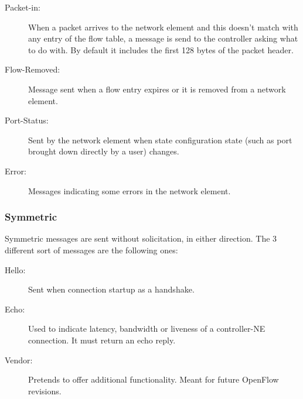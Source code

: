  \begin{description}
\item[ Packet-in:] When a packet arrives to the network element and this doesn't match with any entry of the flow table, a message is send to the controller asking what to do with. By default it includes the first 128 bytes of the packet header. 
\item[ Flow-Removed:] Message sent when a flow entry expires or it is removed from a network element.
\item[ Port-Status:] Sent by the network element when state configuration state (such as port brought down directly by a user) changes.
\item[ Error:] Messages indicating some errors in the network element.
\end{description}

 
 \subsubsection{Symmetric}
 
 Symmetric messages are sent without solicitation, in either direction. The 3 different sort of messages are the following ones:
 
 \begin{description}
\item[ Hello:] Sent when connection startup as a handshake.
\item[ Echo:] Used to indicate latency, bandwidth or liveness of a controller-NE connection. It must return an echo reply.
\item[ Vendor:] Pretends to offer additional functionality. Meant for future OpenFlow revisions. 
\end{description}
